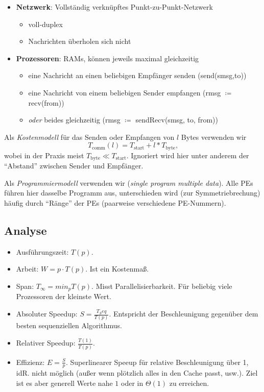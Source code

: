 \begin{itemize}
  \item \textbf{Netzwerk}: Vollständig verknüpftes Punkt-zu-Punkt-Netzwerk
  \begin{itemize}
    \item voll-duplex
    \item Nachrichten überholen sich nicht
  \end{itemize}
  \item \textbf{Prozessoren}: RAMs, können jeweils maximal gleichzeitig
  \begin{itemize}
    \item eine Nachricht an einen beliebigen Empfänger senden (send(smsg,to))
    \item eine Nachricht von einem beliebigen Sender empfangen (rmsg \( \coloneqq \) recv(from))
    \item \emph{oder} beides gleichzeitig (rmsg \( \coloneqq \) sendRecv(smsg, to, from))
  \end{itemize}
\end{itemize}

Als \emph{Kostenmodell} für das Senden oder Empfangen von \( l \) Bytes verwenden wir
\begin{equation*}
  T_\text{comm}(l) = T_\text{start} + l*T_\text{byte}\text{,}
\end{equation*}
wobei in der Praxis meist \( T_\text{byte} \ll T_\text{start} \). Ignoriert wird hier unter anderem der ``Abstand'' zwischen Sender und Empfänger.

Als \emph{Programmiermodell} verwenden wir  (\emph{single program multiple data}). Alle PEs führen hier dasselbe Programm aus, unterschieden wird (zur Symmetriebrechung) häufig durch ``Ränge'' der PEs (paarweise verschiedene PE-Nummern).

\subsection{Analyse}
\begin{itemize}
	\item Ausführungszeit: $T(p)$. 
	\item Arbeit: $W=p\cdot T(p)$. Ist ein Kostenmaß.
	\item Span: $T_\infty = min_p T(p)$. Misst Parallelisierbarkeit. Für beliebig viele Prozessoren der kleinste Wert.
	\item Absoluter Speedup: $S=\frac{T_Seq}{T(p)}$. Entspricht der Beschleunigung gegenüber dem besten sequenziellen Algorithmus. 
	\item Relativer Speedup: $\frac{T(1)}{T(p)}$. 
	\item Effizienz: $E=\frac{S}{p}$. Superlinearer Speeup für relative Beschleunigung über 1, idR. nicht möglich (außer wenn plötzlich alles in den Cache passt, usw.). Ziel ist es aber generell Werte nahe $1$ oder in $\Theta(1)$ zu erreichen. 
\end{itemize}


